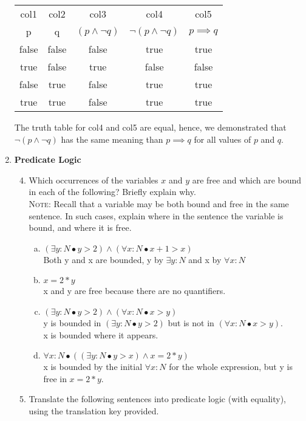 \documentclass{article}
\begin{document}
\begin{enumerate}[\bf I.]
        \begin{center}
            \begin{tabular}{ |c|c|c|c|c| }
                \hline
                col1 & col2 & col3 & col4 & col5 \\
                p & q & $(p \land \neg q)$ & $\neg (p \land \neg q)$ & $p \implies q$ \\
                false & false & false & true & true \\
                true & false & true & false & false \\
                false & true & false & true & true \\
                true & true & false & true & true \\
                \hline
            \end{tabular}
        \end{center}
        The truth table for col4 and col5 are equal, hence, we demonstrated that $\neg (p \land \neg q)$ has the same meaning than $p \implies q$ for all values of $p$ and $q$.
        \item \textbf{Predicate Logic}
        \begin{enumerate}[1.]\setcounter{enumii}{3}
        \item Which occurrences of the variables $x$ and $y$ are free and
        which are bound in each of the following? Briefly explain why.\\
        \textsc{Note}: Recall that a variable may be both
        bound and free in the same sentence. In such cases, explain where in the sentence the variable is bound, and where it is free.
        \begin{enumerate}[a.]
            \item $(\exists y:N\bullet y>2)\wedge(\forall x:N\bullet x+1>x)$ \\
            Both y and x are bounded, y by $\exists y:N$ and x by $\forall x:N$
            \item $x=2\ast y$ \\
            x and y are free because there are no quantifiers.
            \item $(\exists y:N\bullet y>2)\wedge(\forall x:N\bullet x>y)$ \\
            y is bounded in  $(\exists y:N\bullet y>2)$ but is not in $(\forall x:N\bullet x>y)$. \\
            x is bounded where it appears.
            \item $\forall x:N\bullet((\exists y:N\bullet y>x)\wedge x=2\ast y)$ \\
            x is bounded by the initial $\forall x:N$ for the whole expression, but y is free in $x=2\ast y$.
        \end{enumerate}
        \item Translate the following sentences into predicate logic (with equality), using the translation key provided.


\end{enumerate}
\end{enumerate}
\end{document}
